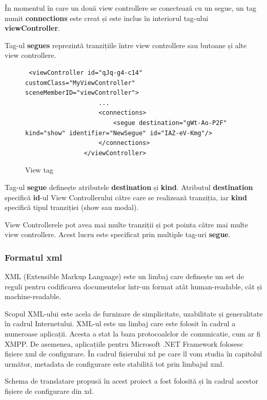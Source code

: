 În momentul în care un două view controllere se conectează cu un segue, un tag numit \textbf{connections} este creat și este inclus în interiorul tag-ului \textbf{viewController}.

Tag-ul \textbf{segues} reprezintă tranzițiile între view controllere sau butoane și alte view controllere.

\begin{figure}[!htbp]
\lstset{language=XML}\label{segueXML}
\begin{lstlisting}
 <viewController id="qJq-g4-c14" customClass="MyViewController" sceneMemberID="viewController">
                    ...
                    <connections>
                        <segue destination="gWt-Ao-P2F" kind="show" identifier="NewSegue" id="IAZ-eV-Kmg"/>
                    </connections>
                </viewController>
\end{lstlisting}
\caption{View tag}\label{fig:view}
\end{figure}

Tag-ul \textbf{segue} definește atributele \textbf{destination} și \textbf{kind}. Atributul \textbf{destination} specifică \textbf{id}-ul View Controllerului către care se realizează tranziția, iar \textbf{kind} specifică tipul tranziției (show sau modal).

View Controllerele pot avea mai multe tranziții și pot pointa către mai multe view controllere. Acest lucru este specificat prin multiple tag-uri \textbf{segue}.

\subsubsection{Formatul xml}

XML (Extensible Markup Language) este un limbaj care definește un set de reguli pentru codificarea documentelor într-un format atât human-readable, cât și machine-readable. 

Scopul XML-ului este acela de furnizare de simplicitate, uzabilitate și generalitate în cadrul Internetului. XML-ul este un limbaj care este folosit în cadrul a numeroase aplicații. Acesta a stat la baza protocoalelor de comunicatie, cum ar fi XMPP. De asemenea, aplicațiile pentru Microsoft .NET Framework folosesc fișiere xml de configurare. În cadrul fișierului xd pe care îl vom studia în capitolul următor, metadata de configurare este stabilită tot prin limbajul xml. 

Schema de translatare propusă în acest proiect a fost folosită și în cadrul acestor fișiere de configurare din xd.

